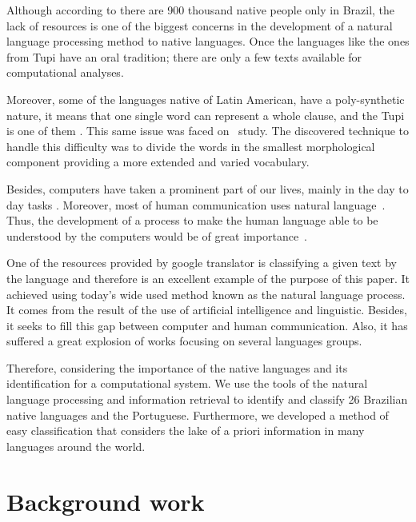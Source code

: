 \documentclass[runningheads]{llncs}
\begin{document}
    Although according to \cite{povos_indigenas} there are 900 thousand native people only in Brazil, the lack of resources is one of the biggest concerns in the development of a natural language processing method to native languages.
    Once the languages like the ones from Tupi have an oral tradition;
    there are only a few texts available for computational analyses.

    Moreover, some of the languages native of Latin American, have a poly-synthetic nature, it means that one single word can represent a whole clause, and the Tupi is one of them \cite{lemos1956tupi}.
    This same issue was faced on~\cite{kann2018fortification} study.
    The discovered technique to handle this difficulty was to divide the words in the smallest morphological component providing a more extended and varied vocabulary.

    Besides, computers have taken a prominent part of our lives, mainly in the day to day tasks \cite{matthews2016introduction}.
    Moreover, most of human communication uses natural language~\cite{matthews2016introduction}.
    Thus,  the development of a process to make the human language able to be understood by the computers would be of great importance~\cite{matthews2016introduction}.

    One of the resources provided by google translator is classifying a given text by the language and therefore is an excellent example of the purpose of this paper.
    It achieved using today's wide used method known as the natural language process.
    It comes from the result of the use of artificial intelligence and linguistic\cite{nadkarni2011natural}.
    Besides, it seeks to fill this gap between computer and human communication. Also, it has suffered a great explosion of works focusing on several languages groups\cite{peters2002evaluation}.


    Therefore, considering the importance of the native languages and its identification for a computational system.
    We use the tools of the natural language processing and information retrieval to identify and classify 26 Brazilian native languages and the Portuguese. Furthermore, we developed a method of easy classification that considers the lake of a priori information in many languages around the world.

    \section{Background work}\label{sec:background-work}
\end{document}

